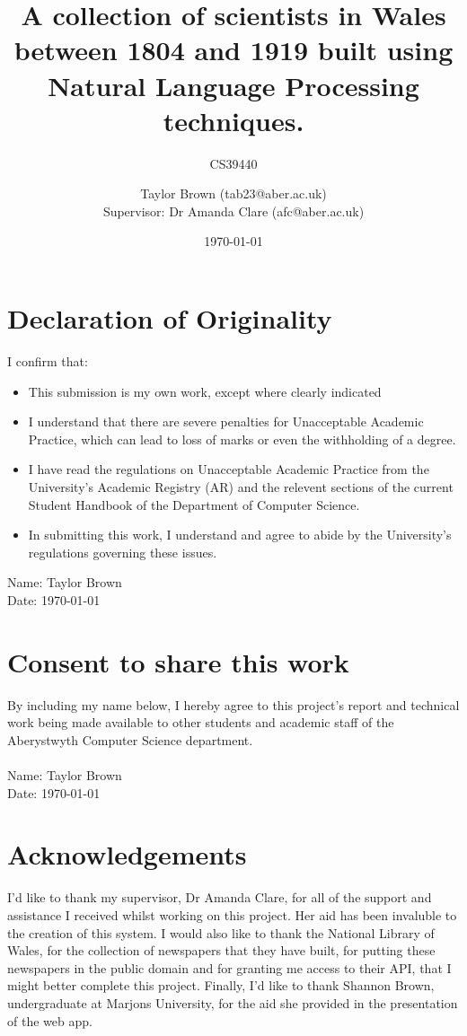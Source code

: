 \documentclass[11pt,a4paper]{book}
\title{A collection of scientists in Wales between 1804 and 1919 built using Natural Language Processing techniques.}
\subtitle{CS39440}
\author{Taylor Brown (tab23@aber.ac.uk) \\
		Supervisor: Dr Amanda Clare (afc@aber.ac.uk)}
\date{\today}
\begin{document}
\maketitle

\section*{Declaration of Originality}
I confirm that:
\begin{itemize}
	\item This submission is my own work, except where clearly indicated
	\item I understand that there are severe penalties for Unacceptable Academic Practice, which can lead to loss of marks or even the withholding of a degree.
	\item I have read the regulations on Unacceptable Academic Practice from the University's Academic Registry (AR) and the relevent sections of the current Student Handbook of the Department of Computer Science.
	\item In submitting this work, I understand and agree to abide by the University's regulations governing these issues.
\end{itemize}
Name: Taylor Brown \\ Date: \today 

\section*{Consent to share this work}
By including my name below, I hereby agree to this project's report and technical work being made available to other students and academic staff of the Aberystwyth Computer Science department. \\\\
Name: Taylor Brown \\ Date: \today 

\section*{Acknowledgements}
I'd like to thank my supervisor, Dr Amanda Clare, for all of the support and assistance I received whilst working on this project. Her aid has been invaluble to the creation of this system. I would also like to thank the National Library of Wales, for the collection of newspapers that they have built, for putting these newspapers in the public domain and for granting me access to their API, that I might better complete this project. Finally, I'd like to thank Shannon Brown, undergraduate at Marjons University, for the aid she provided in the presentation of the web app. 
\end{document}
